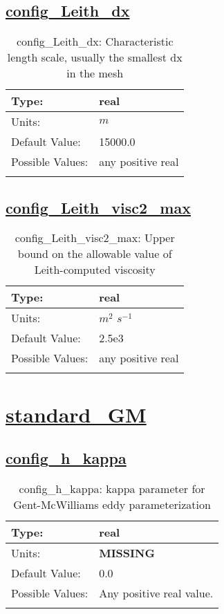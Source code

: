 \subsection[config\_Leith\_dx]{\hyperref[sec:nm_tab_hmix_Leith]{config\_Leith\_dx}}
\label{subsec:nm_sec_config_Leith_dx}
\begin{center}
\begin{longtable}{| p{2.0in} | p{4.0in} |}
    \hline
    Type: & real \\
    \hline
    Units: & $m$ \\
    \hline
    Default Value: & 15000.0 \\
    \hline
    Possible Values: & any positive real \\
    \hline
    \caption{config\_Leith\_dx: Characteristic length scale, usually the smallest dx in the mesh}
\end{longtable}
\end{center}
\subsection[config\_Leith\_visc2\_max]{\hyperref[sec:nm_tab_hmix_Leith]{config\_Leith\_visc2\_max}}
\label{subsec:nm_sec_config_Leith_visc2_max}
\begin{center}
\begin{longtable}{| p{2.0in} | p{4.0in} |}
    \hline
    Type: & real \\
    \hline
    Units: & $m^2$ $s^{-1}$ \\
    \hline
    Default Value: & 2.5e3 \\
    \hline
    Possible Values: & any positive real \\
    \hline
    \caption{config\_Leith\_visc2\_max: Upper bound on the allowable value of Leith-computed viscosity}
\end{longtable}
\end{center}
\section[standard\_GM]{\hyperref[sec:nm_tab_standard_GM]{standard\_GM}}
\label{sec:nm_sec_standard_GM}
\subsection[config\_h\_kappa]{\hyperref[sec:nm_tab_standard_GM]{config\_h\_kappa}}
\label{subsec:nm_sec_config_h_kappa}
\begin{center}
\begin{longtable}{| p{2.0in} | p{4.0in} |}
    \hline
    Type: & real \\
    \hline
    Units: & {\bf \color{red} MISSING} \\
    \hline
    Default Value: & 0.0 \\
    \hline
    Possible Values: & Any positive real value. \\
    \hline
    \caption{config\_h\_kappa: kappa parameter for Gent-McWilliams eddy parameterization}
\end{longtable}
\end{center}
